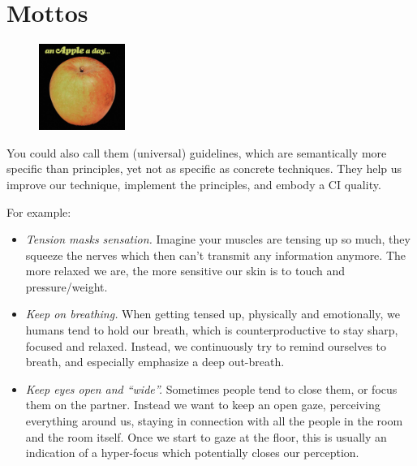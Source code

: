 \section{Mottos}\label{sec:mottos}

\begin{figure}
\centering
\includegraphics[width=0.25\textwidth]{images/mottos}
\end{figure}

You could also call them (universal) guidelines, which are semantically more specific than principles, yet not as specific as concrete techniques.
They help us improve our technique, implement the principles, and embody a CI quality.

For example:

\begin{itemize}
    \item \textit{Tension masks sensation.} Imagine your muscles are tensing up so much, they squeeze the nerves which then can't transmit any information anymore.
    The more relaxed we are, the more sensitive our skin is to touch and pressure/weight.
    \item \textit{Keep on breathing.} When getting tensed up, physically and emotionally, we humans tend to hold our breath, which is counterproductive to stay sharp, focused and relaxed.
    Instead, we continuously try to remind ourselves to breath, and especially emphasize a deep out-breath.
    \item \textit{Keep eyes open and ``wide''.} Sometimes people tend to close them, or focus them on the partner.
    Instead we want to keep an open gaze, perceiving everything around us, staying in connection with all the people in the room and the room itself.
    Once we start to gaze at the floor, this is usually an indication of a hyper-focus which potentially closes our perception.
\end{itemize}
